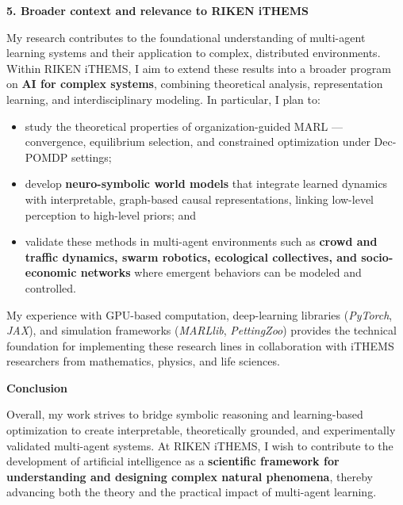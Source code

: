 \documentclass[11pt,a4paper,sans]{moderncv}
\begin{document}
\bigskip
\textbf{5. Broader context and relevance to RIKEN iTHEMS}

\noindent
My research contributes to the foundational understanding of multi-agent learning systems and their application to complex, distributed environments. Within RIKEN iTHEMS, I aim to extend these results into a broader program on \textbf{AI for complex systems}, combining theoretical analysis, representation learning, and interdisciplinary modeling. In particular, I plan to:
\begin{itemize}
    \item study the theoretical properties of organization-guided MARL — convergence, equilibrium selection, and constrained optimization under Dec-POMDP settings;
    \item develop \textbf{neuro-symbolic world models} that integrate learned dynamics with interpretable, graph-based causal representations, linking low-level perception to high-level priors; and
    \item validate these methods in multi-agent environments such as \textbf{crowd and traffic dynamics, swarm robotics, ecological collectives, and socio-economic networks} where emergent behaviors can be modeled and controlled.
\end{itemize}
My experience with GPU-based computation, deep-learning libraries (\textit{PyTorch}, \textit{JAX}), and simulation frameworks (\textit{MARLlib}, \textit{PettingZoo}) provides the technical foundation for implementing these research lines in collaboration with iTHEMS researchers from mathematics, physics, and life sciences.

\bigskip
\textbf{Conclusion}

\noindent
Overall, my work strives to bridge symbolic reasoning and learning-based optimization to create interpretable, theoretically grounded, and experimentally validated multi-agent systems. At RIKEN iTHEMS, I wish to contribute to the development of artificial intelligence as a \textbf{scientific framework for understanding and designing complex natural phenomena}, thereby advancing both the theory and the practical impact of multi-agent learning.

\makeletterclosing
\end{document}

